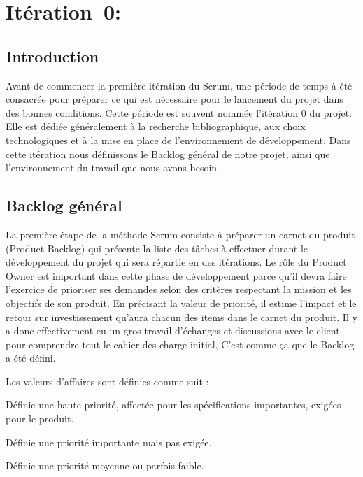 \section[Itération 0: ( 2/20/2017 - 2/22/2017 )]{Itération~0:~\textup{}}

\subsection*{Introduction}

Avant de commencer la première itération du Scrum, une période de temps à été
consacrée pour préparer ce qui est nécessaire pour le lancement du projet dans
des bonnes conditions. Cette période est souvent nommée l'itération 0 du
projet. Elle est dédiée généralement à la recherche bibliographique, aux choix
technologiques et à la mise en place de l'environnement de développement.  Dans
cette itération nous définissons le Backlog général de notre projet, ainsi que
l'environnement du travail que nous avons besoin.

\subsection{Backlog général}

La première étape de la méthode Scrum consiste à préparer un carnet du produit
(Product Backlog) qui présente la liste des tâches à effectuer durant le
développement du projet qui sera répartie en des itérations. Le rôle du Product
Owner est important dans cette phase de développement parce qu'il devra faire
l'exercice de prioriser ses demandes selon des critères respectant la mission
et les objectifs de son produit. En précisant la valeur de priorité, il estime
l'impact et le retour sur investissement qu'aura chacun des items dans le
carnet du produit. Il y a donc effectivement eu un gros travail d'échanges et
discussions avec le client pour comprendre tout le cahier des charge initial,
C'est comme ça que le Backlog a été défini.

Les valeurs d'affaires sont définies comme suit :
\begin{description}[align=right,labelwidth=1cm]
    \item [1:] Définie une haute priorité, affectée pour les spécifications
        importantes, exigées pour le produit.
    \item [2:] Définie une priorité importante mais pas exigée.
    \item [3:] Définie une priorité moyenne ou parfois faible.
\end{description}

